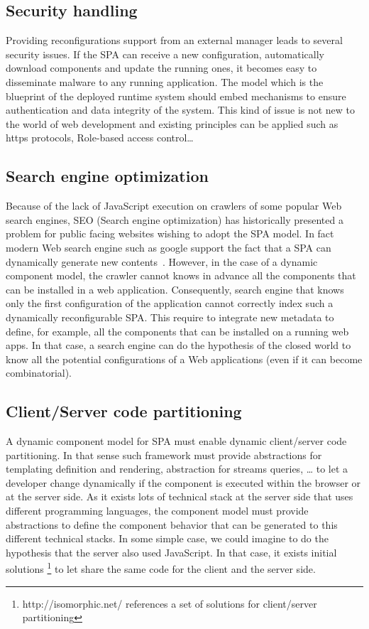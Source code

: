 \subsection{Security handling}
Providing reconfigurations support from an external manager leads to several security issues. 
If the SPA can receive a new configuration, automatically download components and update the running ones, it becomes easy to disseminate malware to any running application. 
The model which is the blueprint of the deployed runtime system should embed mechanisms to ensure authentication and data integrity of the system. 
This kind of issue is not new to the world of web development and existing principles can be applied such as https protocols, Role-based access control\dots

\subsection{Search engine optimization}
Because of the lack of JavaScript execution on crawlers of some popular Web search engines, SEO (Search engine optimization) has historically presented a problem for public facing websites wishing to adopt the SPA model. In fact modern Web search engine such as google support the fact that a SPA can dynamically generate new contents~\cite{googlesearch}. However, in the case of a dynamic component model, the crawler cannot knows in advance all the components that can be installed in a web application. Consequently, search engine that knows only the first configuration of the application cannot correctly index such a dynamically reconfigurable SPA. This require to integrate new metadata to define, for example, all the components that can be installed on a running web apps. In that case, a search engine can do the hypothesis of the closed world to know all the potential configurations of a Web applications (even if it can become combinatorial).  

\subsection{Client/Server code partitioning}
A dynamic component model for SPA must enable dynamic client/server code partitioning. In that sense such framework must provide abstractions for templating definition and rendering, abstraction for streams queries, … to let a developer change dynamically if the component is executed within the browser or at the server side. As it exists lots of technical stack at the server side that uses different programming languages, the component model must provide abstractions to define the component behavior that can be generated to this different technical stacks. In some simple case, we could imagine to do the hypothesis that the server also used JavaScript. In that case, it exists initial solutions \footnote{http://isomorphic.net/ references a set of solutions for client/server partitioning} to let share the same code for the client and the server side.  


